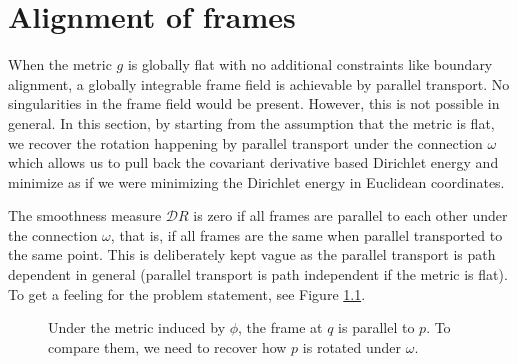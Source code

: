 \documentclass[../thesis.tex]{subfiles}
\begin{document}
\newcommand{\str}[1]{\textsc{#1}}
\newcommand{\var}[1]{\textit{#1}}
\def \ifempty#1{\def\temp{#1} \ifx\temp\empty }
\newcommand{\msg}[2]{\ensuremath{\ifempty{#2} [\str{#1}] \else [\str{#1}, {#2}] \fi}}
\newcommand{\tup}[1]{\ensuremath{\langle #1 \rangle}}
\newcommand{\nil}{\ensuremath{\bot}}
\newcommand{\false}{\textsc{false}\xspace}
\newcommand{\true}{\textsc{true}\xspace}

\newcommand\lastts{\var{lastts}\xspace}
\newcommand\nextts{\var{nextts}\xspace}
\newcommand\trusted{\var{trusted}\xspace}
\newcommand\newepoch{\var{newepoch}\xspace}
\newcommand\leader{\var{leader}\xspace}
\newcommand\ts{\var{ts}\xspace}
\newcommand{\CK}{\ensuremath{\mathcal{K}}\xspace}
\newcommand{\CP}{\ensuremath{\mathcal{P}}\xspace}
\newcommand{\CQ}{\ensuremath{\mathcal{Q}}\xspace}


\chapter{Alignment of frames}
\label{ch:calculation}
When the metric $g$ is globally flat with no additional constraints like
boundary alignment, a globally integrable frame field is achievable
by parallel transport. No singularities in the frame field would be present.
However, this is not possible in general.
In this section, by starting from the assumption that the metric
is flat, we recover the rotation happening by parallel transport under
the connection $\omega$ which allows us
to pull back the covariant derivative based Dirichlet energy
and minimize as if we were minimizing
the Dirichlet energy in Euclidean coordinates.

The smoothness measure $\mathcal{D}R$ is zero if all frames are parallel
to each other under the connection $\omega$, that is, if all frames
are the same when parallel transported to the same point.
This is deliberately kept vague as the parallel transport is path
dependent in general (parallel transport is path independent if the metric is flat).
To get a feeling for the problem statement, see Figure \ref{fig:rotation}.

\begin{figure}[htb]
  \centering
  \def\svgwidth{20em}
  
  \caption{Under the metric induced by $\phi$, the frame at $q$ is parallel to $p$.
  To compare them, we need to recover how $p$ is rotated under $\omega$.}
  \label{fig:rotation}
\end{figure}
\end{document}
